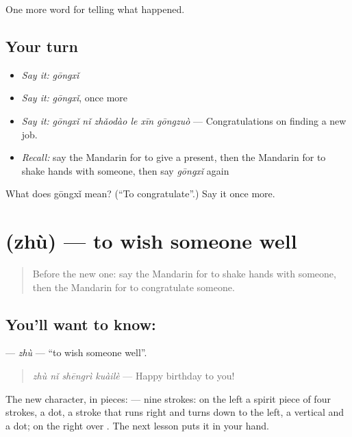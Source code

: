 \begin{grammarlens}[title={What you've built}]
One more word for telling what happened.
\end{grammarlens}

\subsection*{Your turn}
\begin{itemize}
\raggedright
  \item \emph{Say it:} \emph{gōngxǐ}
  \item \emph{Say it:} \emph{gōngxǐ}, once more
  \item \emph{Say it:} \emph{gōngxǐ nǐ zhǎodào le xīn gōngzuò} — Congratulations on finding a new job.
  \item \emph{Recall:} say the Mandarin for to give a present, then the Mandarin for to shake hands with someone, then say \emph{gōngxǐ} again
\end{itemize}

\begin{tcolorbox}[breakable,colback=teal!4,colframe=teal!35!black,title={Before you move on}]
What does gōngxǐ mean? (\textquotedblleft{}To congratulate\textquotedblright{}.) Say it once more.
\end{tcolorbox}
\section[\texorpdfstring{\zh{祝} (zhù)}{祝 (zhù)}]{ (zhù) — to wish someone well}

\label{lesson:ZH-C337-zhu-wish}



\begin{quote}
Before the new one: say the Mandarin for to shake hands with someone, then the Mandarin for to congratulate someone.
\end{quote}

\subsection*{You'll want to know: }
\textbf{} — \emph{zhù} — \textquotedblleft{}to wish someone well\textquotedblright{}.

\begin{quote}
\textbf{} \emph{zhù nǐ shēngrì kuàilè} — Happy birthday to you!
\end{quote}

The new character, in pieces:  — nine strokes: on the left a spirit piece of four strokes, a dot, a stroke that runs right and turns down to the left, a vertical and a dot; on the right  over . The next lesson puts it in your hand.

